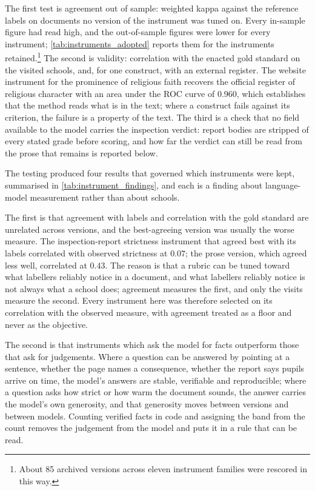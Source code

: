 The first test is agreement out of sample: weighted kappa against the
reference labels on documents no version of the instrument was tuned on.
Every in-sample figure had read high, and the out-of-sample figures were
lower for every instrument; \cref{tab:instruments_adopted} reports them for
the instruments retained.\footnote{About 85 archived versions across eleven
instrument families were rescored in this way.} The second is validity:
correlation with the enacted gold standard on the visited schools, and, for
one construct, with an external register. The website instrument for the
prominence of religious faith recovers the official register of religious
character with an area under the ROC curve of 0.960, which establishes that
the method reads what is in the text; where a construct fails against its
criterion, the failure is a property of the text. The third is a check that no
field available to the model carries the inspection verdict: report bodies
are stripped of every stated grade before scoring, and how far the verdict
can still be read from the prose that remains is reported below.



The testing produced four results that governed which instruments were kept,
summarised in \cref{tab:instrument_findings}, and each is a finding about
language-model measurement rather than about schools.

The first is that agreement with labels and correlation with the gold
standard are unrelated across versions, and the best-agreeing version was
usually the worse measure. The inspection-report strictness instrument that
agreed best with its labels correlated with observed strictness at $0.07$;
the prose version, which agreed less well, correlated at $0.43$. The reason
is that a rubric can be tuned toward what labellers reliably notice in a
document, and what labellers reliably notice is not always what a school
does; agreement measures the first, and only the visits measure the second.
Every instrument here was therefore selected on its correlation with the
observed measure, with agreement treated as a floor and never as the
objective.

The second is that instruments which ask the model for facts outperform those
that ask for judgements. Where a question can be answered by pointing at a
sentence, whether the page names a consequence, whether the report says
pupils arrive on time, the model's answers are stable, verifiable and
reproducible; where a question asks how strict or how warm the document
sounds, the answer carries the model's own generosity, and that generosity
moves between versions and between models. Counting verified facts in code
and assigning the band from the count removes the judgement from the model
and puts it in a rule that can be read.

